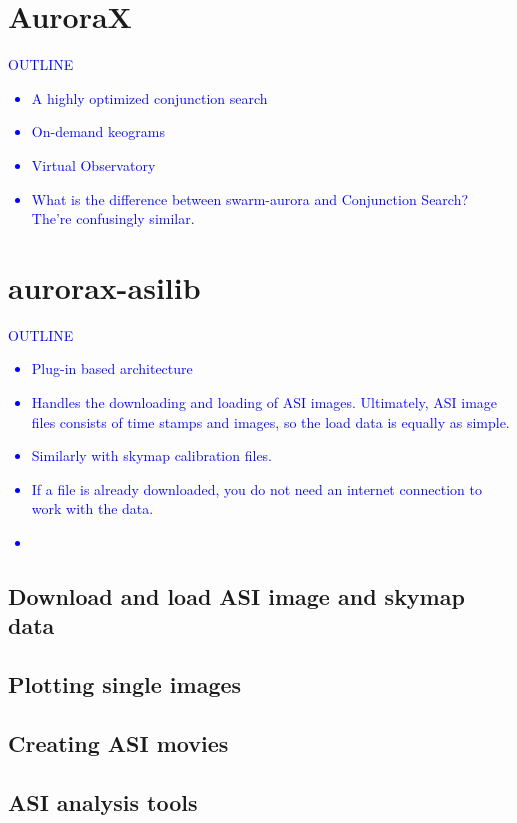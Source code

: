 \documentclass[draft]{agujournal2019}
\begin{document}
\section{AuroraX}\label{aurorax}
\textcolor{blue}{
      OUTLINE
      \begin{itemize}
            \item A highly optimized conjunction search
            \item On-demand keograms
            \item Virtual Observatory
            \item What is the difference between swarm-aurora and Conjunction Search? The're confusingly similar.
      \end{itemize}
}

\section{aurorax-asilib}\label{aurorax-asilib}
\textcolor{blue}{
      OUTLINE
      \begin{itemize}
            \item Plug-in based architecture
            \item Handles the downloading and loading of ASI images. Ultimately, ASI image files consists of time stamps and images, so the load data is equally as simple.
            \item Similarly with skymap calibration files.
            \item If a file is already downloaded, you do not need an internet connection to work with the data.
            \item 
      \end{itemize}
}
\subsection{Download and load ASI image and skymap data}

\subsection{Plotting single images}

\subsection{Creating ASI movies}

\subsection{ASI analysis tools}
\end{document}
